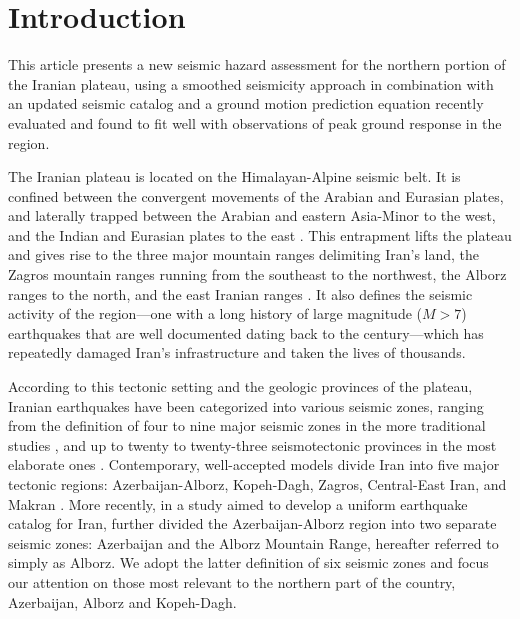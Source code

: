 
\section{Introduction}

This article presents a new seismic hazard assessment for the northern portion of the Iranian plateau, using a smoothed seismicity approach in combination with an updated seismic catalog and a ground motion prediction equation recently evaluated and found to fit well with observations of peak ground response in the region.

The Iranian plateau is located on the Himalayan-Alpine seismic belt. It is confined between the convergent movements of the Arabian and Eurasian plates, and laterally trapped between the Arabian and eastern Asia-Minor to the west, and the Indian and Eurasian plates to the east \citep{Berberian_1981_Chap}. This entrapment lifts the plateau and gives rise to the three major mountain ranges delimiting Iran's land, the Zagros mountain ranges running from the southeast to the northwest, the Alborz ranges to the north, and the east Iranian ranges . It also defines the seismic activity of the region---one with a long history of large magnitude ($M>7$) earthquakes that are well documented dating back to the  century---which has repeatedly damaged Iran's infrastructure and taken the lives of thousands.

According to this tectonic setting and the geologic provinces of the plateau, Iranian earthquakes have been categorized into various seismic zones, ranging from the definition of four to nine major seismic zones in the more traditional studies \citep[e.g.,][]{Stocklin1968, Takin1972, Berberian1976}, and up to twenty to twenty-three seismotectonic provinces in the most elaborate ones \citep[e.g.,][]{Nowroozi1976, Tavakoli1999}. Contemporary, well-accepted models divide Iran into five major tectonic regions: Azerbaijan-Alborz, Kopeh-Dagh, Zagros, Central-East Iran, and Makran \citep[e.g.,][]{Mirzaei1998}. More recently, in a study aimed to develop a uniform earthquake catalog for Iran, \citet{Karimiparidari2013} further divided the Azerbaijan-Alborz region into two separate seismic zones: Azerbaijan and the Alborz Mountain Range, hereafter referred to simply as Alborz. We adopt the latter definition of six seismic zones and focus our attention on those most relevant to the northern part of the country, Azerbaijan, Alborz and Kopeh-Dagh.

